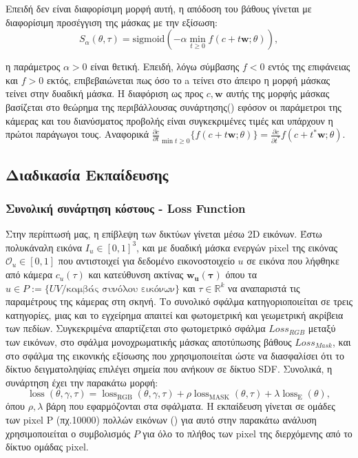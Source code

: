 Επειδή δεν είναι διαφορίσιμη μορφή  αυτή, η απόδοση του βάθους γίνεται με διαφορίσιμη προσέγγιση της μάσκας με την εξίσωση:
\begin{equation}
    S_{\alpha}(\theta,\tau)=\mathrm{sigmoid}\left(-\alpha\operatorname*{min}_{t\geq0}f(c+t \boldsymbol{w};\theta)\right),
    \label{eq:maskapproximationfunc}
\end{equation}

η παράμετρος  $\alpha > 0$ είναι θετική. Επειδή, λόγω σύμβασης $f<0$ εντός της επιφάνειας και $f>0$ εκτός, επιβεβαιώνεται πως όσο το a τείνει στο άπειρο η  μορφή μάσκας τείνει στην δυαδική μάσκα. H διαφόριση ως προς $c,\boldsymbol{w}$ αυτής της μορφής μάσκας βασίζεται στο θεώρημα της περιβάλλουσας συνάρτησης() εφόσον οι παράμετροι της κάμερας και του διανύσματος προβολής είναι συγκεκριμένες τιμές και υπάρχουν η πρώτοι παράγωγοι τους. Αναφορικά $\frac{\partial c}{\partial t}_{\min t\geq 0} \{ f(c + t \boldsymbol{w}; \theta) \} = \frac{\partial c}{\partial t^*} f(c + t^*\boldsymbol{w}; \theta)$.



\subsection{Διαδικασία Εκπαίδευσης}
\subsubsection{Συνολική συνάρτηση κόστους - Loss Function}
Στην περίπτωσή μας, η επίβλεψη των δικτύων γίνεται μέσω 2D εικόνων. Έστω πολυκάναλη εικόνα $I_u \in [0,1]^{3}$, και με δυαδική μάσκα ενεργών pixel της εικόνας $\mathcal{O}_u \in [0,1]$ που αντιστοιχεί για δεδομένο εικονοστοιχείο $u$ σε εικόνα που λήφθηκε από κάμερα $c_u(\tau)$ και κατεύθυνση ακτίνας $\boldsymbol{w_u(\tau)}$ όπου τα $u \in P := \{UV / \text{καμβάς συνόλου εικόνων}\}$ και $\tau \in \mathbb{R}^{k}$ να αναπαριστά τις παραμέτρους της κάμερας στη σκηνή. Το συνολικό σφάλμα κατηγοριοποιείται σε τρεις κατηγορίες, μιας και το εγχείρημα απαιτεί και φωτομετρική και γεωμετρική ακρίβεια των πεδίων. Συγκεκριμένα απαρτίζεται στο φωτομετρικό σφάλμα $Loss_{RGB}$  μεταξύ των εικόνων, στο σφάλμα μονοχρωματικής μάσκας αποτύπωσης βάθους $Loss_{Mask}$, και στο σφάλμα της εικονικής εξίσωσης  που χρησιμοποιείται ώστε να διασφαλίσει ότι το δίκτυο δειγματοληψίας επιλέγει σημεία που ανήκουν σε δίκτυο SDF. Συνολικά, η συνάρτηση έχει την παρακάτω μορφή:
\begin{equation}
    \operatorname{loss}(\theta, \gamma, \tau) = \operatorname{loss}_{\mathrm{RGB}}(\theta, \gamma, \tau) + \rho \operatorname{loss}_{\mathrm{MASK}}(\theta, \tau) + \lambda \operatorname{loss}_{\mathrm{E}}(\theta),
    \label{eq:IDRLoss}
\end{equation}
όπου $\rho, \lambda$ βάρη που εφαρμόζονται στα σφάλματα. Η εκπαίδευση γίνεται σε ομάδες των pixel P (πχ.10000) πολλών εικόνων () για αυτό στην παρακάτω ανάλυση χρησιμοποιείται ο συμβολισμός $P$ για όλο το πλήθος των pixel της διερχόμενης από το δίκτυο ομάδας pixel. 
